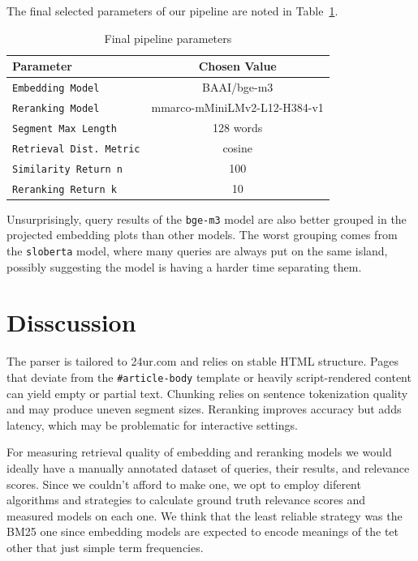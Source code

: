 \documentclass[conference]{IEEEtran}
\begin{document}
The final selected parameters of our pipeline are noted in Table~\ref{tab:final_params}. 

\begin{table}[h]
\centering
\caption{Final pipeline parameters}
\label{tab:final_params}
\begin{tabular}{|l|c|}
\hline
\textbf{Parameter} & \textbf{Chosen Value} \\
\hline
\texttt{Embedding Model} & BAAI/bge-m3 \\
\texttt{Reranking Model} & mmarco-mMiniLMv2-L12-H384-v1 \\
\texttt{Segment Max Length} & 128 words \\
\texttt{Retrieval Dist. Metric} & cosine \\ 
\texttt{Similarity Return n} & 100 \\
\texttt{Reranking Return k} & 10 \\
\hline
\end{tabular}
\end{table}

Unsurprisingly, query results of the \texttt{bge-m3} model are also better grouped in the projected embedding plots than other models. The worst grouping comes from the \texttt{sloberta} model, where many queries are always put on the same island, possibly suggesting the model is having a harder time separating them.



\section{Disscussion} \label{discussion}

The parser is tailored to 24ur.com and relies on stable HTML structure. Pages that deviate from the \texttt{\#article-body} template or heavily script-rendered content can yield empty or partial text. Chunking relies on sentence tokenization quality and may produce uneven segment sizes. Reranking improves accuracy but adds latency, which may be problematic for interactive settings.

For measuring retrieval quality of embedding and reranking models we would ideally have a manually annotated dataset of queries, their results, and relevance scores. Since we couldn't afford to make one, we opt to employ diferent algorithms and strategies to calculate ground truth relevance scores and measured models on each one. We think that the least reliable strategy was the BM25 one since embedding models are expected to encode meanings of the tet other that just simple term frequencies. 
\end{document}
